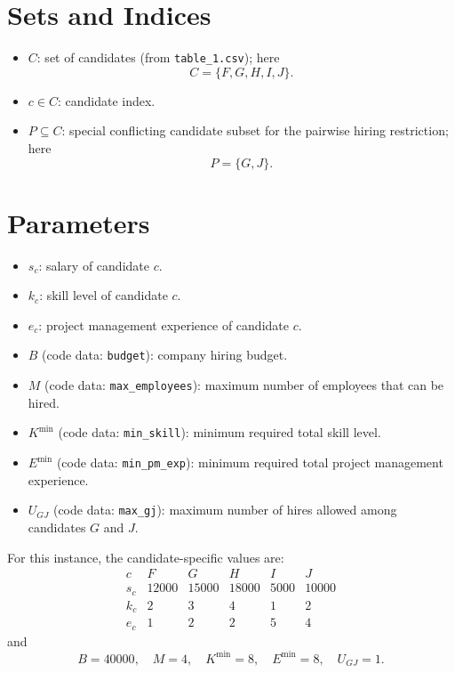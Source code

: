 \section*{Sets and Indices}

\begin{itemize}
    \item $C$: set of candidates (from \texttt{table\_1.csv}); here
    \[
    C=\{F,G,H,I,J\}.
    \]
    \item $c \in C$: candidate index.
    \item $P \subseteq C$: special conflicting candidate subset for the pairwise hiring restriction; here
    \[
    P=\{G,J\}.
    \]
\end{itemize}

\section*{Parameters}

\begin{itemize}
    \item $s_c$: salary of candidate $c$.
    \item $k_c$: skill level of candidate $c$.
    \item $e_c$: project management experience of candidate $c$.
    \item $B$ (code data: \texttt{budget}): company hiring budget.
    \item $M$ (code data: \texttt{max\_employees}): maximum number of employees that can be hired.
    \item $K^{\min}$ (code data: \texttt{min\_skill}): minimum required total skill level.
    \item $E^{\min}$ (code data: \texttt{min\_pm\_exp}): minimum required total project management experience.
    \item $U_{GJ}$ (code data: \texttt{max\_gj}): maximum number of hires allowed among candidates $G$ and $J$.
\end{itemize}

For this instance, the candidate-specific values are:
\[
\begin{array}{c|ccccc}
c & F & G & H & I & J \\ \hline
s_c & 12000 & 15000 & 18000 & 5000 & 10000 \\
k_c & 2 & 3 & 4 & 1 & 2 \\
e_c & 1 & 2 & 2 & 5 & 4
\end{array}
\]
and
\[
B=40000,\quad M=4,\quad K^{\min}=8,\quad E^{\min}=8,\quad U_{GJ}=1.
\]

